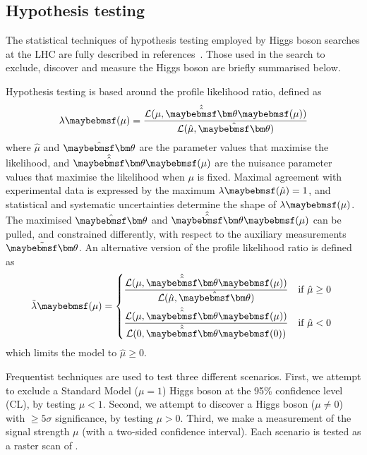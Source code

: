 \subsection{Hypothesis testing}
\label{sec:stat:tests}

The statistical techniques of hypothesis testing employed by Higgs boson searches at the LHC 
are fully described in references~\cite{Cowan:2010,Cranmer:lectures}. Those used in the \HWW 
search to exclude, discover and measure the Higgs boson are briefly summarised below.

Hypothesis testing is based around the profile likelihood ratio, defined as
\begin{equation}
	\lambda\parenths{\mu} = \frac{\mathcal{L}(\mu, \hat{\hat{\bvec{\theta}}}\parenths{\mu})}{\mathcal{L}(\hat{\mu}, \hat{\bvec{\theta}})}
\end{equation}
where $\hat{\mu}$ and $\hat{\bvec{\theta}}$ are the parameter values that maximise the 
likelihood, and $\hat{\hat{\bvec{\theta}}}\parenths{\mu}$ are the nuisance parameter values 
that maximise the likelihood when $\mu$ is fixed. Maximal agreement with experimental data 
is expressed by the maximum $\lambda\parenths{\hat{\mu}} = 1$, and statistical and 
systematic uncertainties determine the shape of $\lambda\parenths{\mu}$. The maximised 
$\hat{\bvec{\theta}}$ and $\hat{\hat{\bvec{\theta}}}\parenths{\mu}$ can be pulled, and 
constrained differently, with respect to the auxiliary measurements $\tilde{\bvec{\theta}}$. 
An alternative version of the profile likelihood ratio is defined as
\begin{equation}
	\tilde{\lambda}\parenths{\mu} = 
	\begin{dcases*}
		\frac{\mathcal{L}(\mu, \hat{\hat{\bvec{\theta}}}\parenths{\mu})}{\mathcal{L}(\hat{\mu}, \hat{\bvec{\theta}})} & if $\hat{\mu} \geq 0$ \\
		\frac{\mathcal{L}(\mu, \hat{\hat{\bvec{\theta}}}\parenths{\mu})}{\mathcal{L}(0, \hat{\hat{\bvec{\theta}}}\parenths{0})} & if $\hat{\mu} < 0$
	\end{dcases*}
\end{equation}
which limits the model to $\hat{\mu} \geq 0$.

Frequentist techniques are used to test three different scenarios. First, we attempt to 
exclude a Standard Model (\ie $\mu = 1$) Higgs boson at the 95\% confidence level (CL), by 
testing $\mu < 1$. Second, we attempt to discover a Higgs boson (\ie $\mu \neq 0$) with 
$\geq\!5\sigma$ significance, by testing $\mu > 0$. Third, we make a measurement of the 
signal strength $\mu$ (with a two-sided confidence interval). Each scenario is tested as 
a raster scan of \mH.

